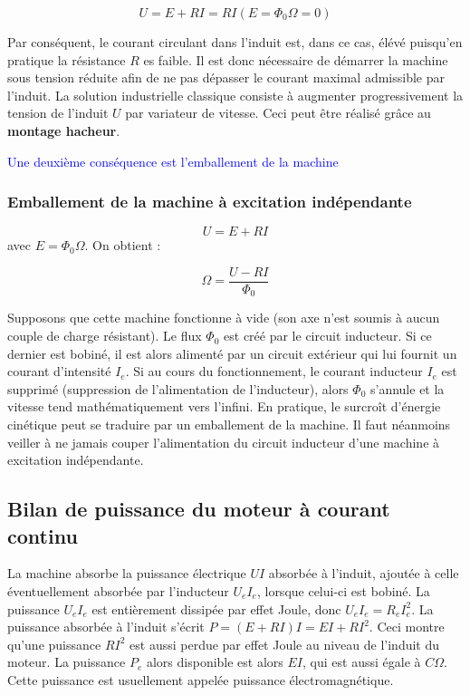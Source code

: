 \documentclass{article}
\begin{document}
\begin{equation}
    U = E + RI = RI (E=\Phi_0\Omega=0)
\end{equation}

Par conséquent, le courant circulant dans l'induit est, dans ce cas, élévé puisqu'en pratique la résistance $R$ es faible. Il est donc nécessaire de démarrer la machine sous tension réduite afin de ne pas dépasser le courant maximal admissible par l'induit. La solution industrielle classique consiste à augmenter progressivement la tension de l'induit $U$ par variateur de vitesse. Ceci peut être réalisé grâce au \textbf{montage hacheur}.

\textcolor{blue}{Une deuxième conséquence est l'emballement de la machine}

\subsubsection*{Emballement de la machine à excitation indépendante}

\begin{equation}
    U = E + RI
\end{equation}
avec $E=\Phi_0 \Omega$. On obtient :

\begin{equation}
    \Omega = \frac{U - RI}{\Phi_0}
\end{equation}

Supposons que cette machine fonctionne à vide (son axe n'est soumis à aucun couple de charge résistant). Le flux $\Phi_0$ est créé par le circuit inducteur. Si ce dernier est bobiné, il est alors alimenté par un circuit extérieur qui lui fournit un courant d'intensité $I_e$. Si au cours du fonctionnement, le courant inducteur $I_e$ est supprimé (suppression de l'alimentation de l'inducteur), alors $\Phi_0$ s'annule et la vitesse tend mathématiquement vers l'infini. En pratique, le surcroît d'énergie cinétique peut se traduire par un emballement de la machine. Il faut néanmoins veiller à ne jamais couper l'alimentation du circuit inducteur d'une machine à excitation indépendante. 

\subsection{Bilan de puissance du moteur à courant continu}

La machine absorbe la puissance électrique $UI$ absorbée à l'induit, ajoutée à celle éventuellement absorbée par l'inducteur $U_e I_e$, lorsque celui-ci est bobiné. La puissance $U_e I_e$ est entièrement dissipée par effet Joule, donc $U_e I_e = R_e I_e^2$.
\medskip
La puissance absorbée à l'induit s'écrit $P = (E + RI)I = EI + RI^2$. Ceci montre qu'une puissance $RI^2$ est aussi perdue par effet Joule au niveau de l'induit du moteur. La puissance $P_e$ alors disponible est alors $EI$, qui est aussi égale à $C\Omega$. Cette puissance est usuellement appelée puissance électromagnétique.\medskip
\end{document}

